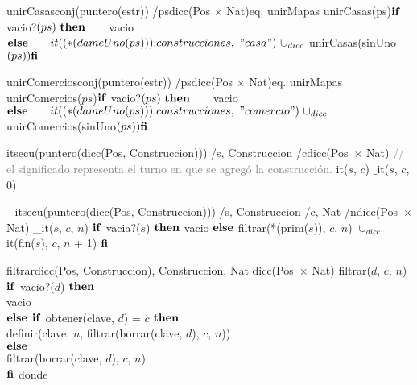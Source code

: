 \vspace{4mm}
\tadOperacion
{unirCasas}{conj(puntero(estr)) /ps}{dicc(Pos $\times$ Nat)}{eq. unirMapas}          
\tadAxioma
{unirCasas(ps)}{$
    \LIF\ $vacio?$(ps)\ \textrm{\textbf{then}}\ \\ 
    \hspace*{7mm} $vacio$\ \\
    \LELSE\ \\
    \tab it((*(dameUno(ps))).construcciones,\ "casa")\ \cup_{dicc}\ $unirCasas(sinUno$(ps))\ \\
    \textrm{\textbf{fi}}
$}

\vspace{4mm}
\tadOperacion
{unirComercios}{conj(puntero(estr)) /ps}{dicc(Pos $\times$ Nat)}{eq. unirMapas} 
\tadAxioma
{unirComercios($ps$)}{$
    \LIF\ $vacio?$(ps)\ \textrm{\textbf{then}}\ \\
    \hspace*{7mm} $vacio$\ \\
    \LELSE\ \\
    \tab it((*(dameUno(ps))).construcciones,\ "comercio")\ \cup_{dicc}\ $unirComercios(sinUno$(ps))\ \\
    \textrm{\textbf{fi}}
$}

\vspace{4mm}
\tadOperacion
{it}{secu(puntero(dicc(Pos, Construccion))) /s, Construccion /c}{dicc(Pos\ $\times$ Nat)}{}
\textcolor{gray}{// el significado representa el turno en que se agregó la construcción.}  
\tadAxioma
{it($s$, $c$)}{
    $\_$it($s$, $c$, 0)
}

\vspace{4mm}
\tadOperacion
{\_it}{secu(puntero(dicc(Pos, Construccion))) /s, Construccion /c, Nat /n}{dicc(Pos\ $\times$ Nat)}{}
\tadAxioma
{\_it($s$, $c$, $n$)}{
    $\textrm{\textbf{if}}$ vacia?($s$) $\textrm{\textbf{then}}$ 
        vacio 
    $\textrm{\textbf{else}}$ 
        filtrar(*(prim($s$)), $c$, $n$) $\cup_{dicc}$ it(fin($s$), $c$, $n$ + 1) 
    $\textrm{\textbf{fi}}$
}

\vspace{4mm}
\tadOperacion
{filtrar}{dicc(Pos, Construccion), Construccion, Nat }{dicc(Pos\ $\times$ Nat)}{}
\tadAxioma
{filtrar($d$, $c$, $n$)}{
    $\textrm{\textbf{if}}$ vacio?($d$) $\textrm{\textbf{then}}$ \\ 
    \tab vacio \\
    $\textrm{\textbf{else}}$ $\textrm{\textbf{if}}$ obtener(clave, $d$) = $c$ $\textrm{\textbf{then}}$ \\ 
    \tab definir(clave, $n$, filtrar(borrar(clave, $d$), $c$, $n$)) \\
    $\textrm{\textbf{else}}$ \\
    \tab filtrar(borrar(clave, $d$), $c$, $n$) \\
    $\textrm{\textbf{fi}}$
}
donde 

